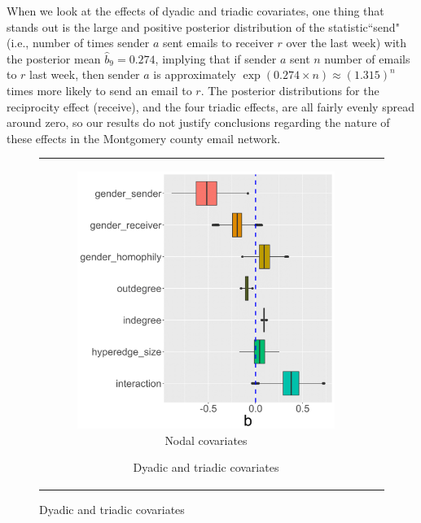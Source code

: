 \documentclass[ba]{imsart}
\numberwithin{equation}{section}
\theoremstyle{plain}
\begin{document}
	When we look at the effects of dyadic and triadic covariates, one thing that stands out is the large and positive posterior distribution of the statistic``send" (i.e., number of times sender $a$ sent emails to receiver $r$ over the last week) with the posterior mean $\hat{b}_9 = 0.274$, implying that if sender $a$ sent $n$ number of emails to $r$ last week, then sender $a$ is approximately $\exp(0.274\times n)\approx(1.315)^n$ times more likely to send an email to $r$. The posterior distributions for the reciprocity effect (receive), and the four triadic effects, are all fairly evenly spread around zero, so our results do not justify conclusions regarding the nature of these effects in the Montgomery county email network.
			\begin{figure}[!t]
				\centering
				\begin{tabular}[t]{cc}
					\begin{subfigure}[b]{0.4975\textwidth}
						\caption{Nodal covariates}
						\includegraphics[width=\textwidth]{img/betanewplot2-1.png}	
					\end{subfigure}
					\begin{subfigure}[b]{0.4975\textwidth}
						\caption{Dyadic and triadic covariates}

\end{subfigure}
\end{tabular}
\end{figure}
\end{document}
